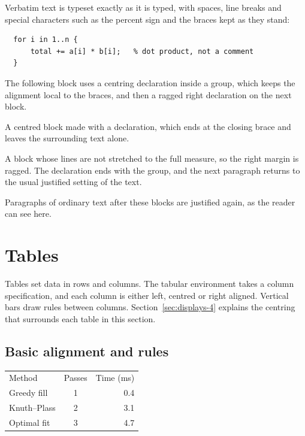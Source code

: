 \documentclass{article}
\begin{document}
Verbatim text is typeset exactly as it is typed, with spaces, line breaks and special
characters such as the percent sign and the braces kept as they stand:

\begin{verbatim}
  for i in 1..n {
      total += a[i] * b[i];   % dot product, not a comment
  }
\end{verbatim}

The following block uses a centring declaration inside a group, which keeps the
alignment local to the braces, and then a ragged right declaration on the next block.

{\centering A centred block made with a declaration, which ends at the closing
brace and leaves the surrounding text alone.\par}

{\raggedright A block whose lines are not stretched to the full measure, so the
right margin is ragged. The declaration ends with the group, and the next paragraph
returns to the usual justified setting of the text.\par}

Paragraphs of ordinary text after these blocks are justified again, as the reader can
see here.

\section{Tables}\label{sec:tables-4}

Tables set data in rows and columns. The tabular environment takes a column
specification, and each column is either left, centred or right aligned. Vertical bars
draw rules between columns. Section~\ref{sec:displays-4} explains the centring that surrounds each table in
this section.

\subsection{Basic alignment and rules}\label{sec:tables-basic-4}

\begin{center}
\begin{tabular}{l c r}
Method & Passes & Time (ms) \\
Greedy fill      & 1 & 0.4 \\
Knuth--Plass     & 2 & 3.1 \\
Optimal fit      & 3 & 4.7 \\
\end{tabular}
\end{center}
\end{document}
